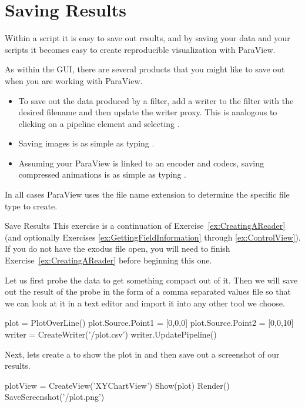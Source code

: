 \section{Saving Results}
\label{sec:Saving}

Within a script it is easy to save out results, and by saving your data and
your scripts it becomes easy to create reproducible visualization with
ParaView.

As within the GUI, there are several products that you might like to save out when you are working with ParaView.
\begin{itemize}
\item To save out the data produced by a filter, add a writer to the filter
  with the desired filename and then update the writer proxy. This is
  analogous to clicking on a pipeline element and selecting .
\item Saving images is as simple as typing
  .
\item Assuming your ParaView is linked to an encoder and codecs, saving
  compressed animations is as simple as typing
  .
\end{itemize}
In all cases ParaView uses the file name extension to determine the
specific file type to create.

\begin{exercise}{Save Results}
  \label{ex:SaveResults}%
  This exercise is a continuation of Exercise~\ref{ex:CreatingAReader} (and
  optionally Exercises \ref{ex:GettingFieldInformation} through
  \ref{ex:ControlView}). If you do not have the exodus file open, you will
  need to finish Exercise~\ref{ex:CreatingAReader} before beginning this
  one.

  Let us first probe the data to get something compact out of it. Then we will save out the result of the probe in the form of a comma separated values file so that we can look at it in a text editor and import it into any other tool we choose.

  \begin{pythonpluscommands}
plot = PlotOverLine()
plot.Source.Point1 = [0,0,0]
plot.Source.Point2 = [0,0,10]
writer = CreateWriter('/plot.csv')
writer.UpdatePipeline()
  \end{pythonpluscommands}

  Next, lets create a  to show the plot in and then save out a screenshot of our results.
  \begin{pythonpluscommands}
plotView = CreateView('XYChartView')
Show(plot)
Render()
SaveScreenshot('/plot.png')
  \end{pythonpluscommands}
\end{exercise}

